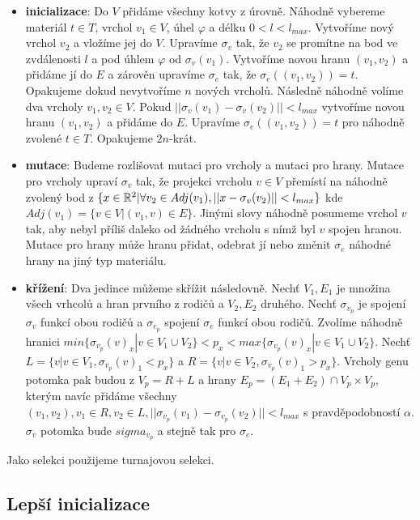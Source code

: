 \begin{itemize}
    \item \textbf{inicializace}: Do $V$ přidáme všechny kotvy z úrovně. Náhodně vybereme materiál $t \in T$, vrchol $v_1 \in V$, úhel $\varphi$ a délku $0 < l < l_{max}$. Vytvoříme nový vrchol $v_2$ a vložíme jej do $V$. Upravíme $\sigma_v$ tak, že $v_2$ se promítne na bod ve zvdálenosti $l$ a pod úhlem $\varphi$ od $\sigma_v(v_1)$. Vytvoříme novou hranu $(v_1, v_2)$ a přidáme jí do $E$ a zárověn upravíme $\sigma_e$ tak, že $\sigma_e((v_1, v_2)) = t$. Opakujeme dokud nevytvoříme $n$ nových vrcholů. Následně náhodně volíme dva vrcholy $v_1, v_2 \in V$. Pokud $||\sigma_v(v_1) - \sigma_v(v_2)|| < l_{max}$ vytvoříme novou hranu $(v_1, v_2)$ a přidáme do $E$. Upravíme $\sigma_e((v_1, v_2)) = t$ pro náhodně zvolené $t \in T$. Opakujeme $2n$-krát.
    \item \textbf{mutace}: Budeme rozlišovat mutaci pro vrcholy a mutaci pro hrany. Mutace pro vrcholy upraví $\sigma_v$ tak, že projekci vrcholu $v \in V$ přemístí na náhodně zvolený bod z $\{ x \in \mathbb{R}^2 | \forall v_2 \in Adj(v_1), ||x - \sigma_v(v_2)|| < l_{max}\}$ kde $Adj(v_1) = \{v \in V | (v_1, v) \in E\}$. Jinými slovy náhodně posumeme vrchol $v$ tak, aby nebyl příliš daleko od žádného vrcholu s nímž byl $v$ spojen hranou. Mutace pro hrany může hranu přidat, odebrat jí nebo změnit $\sigma_e$ náhodné hrany na jiný typ materiálu.
    \item \textbf{křížení}: Dva jedince můžeme skřížit následovně. Nechť $V_1, E_1$ je množina všech vrhcolů a hran prvního z rodičů a $V_2, E_2$ druhého. Nechť $\sigma_{v_p}$ je spojení $\sigma_v$ funkcí obou rodičů a $\sigma_{e_p}$ spojení $\sigma_e$ funkcí obou rodičů. Zvolíme náhodně hranici $min\{\sigma_{v_p}(v)_x | v \in V_1 \cup V_2\} < p_x < max\{\sigma_{v_p}(v)_x | v \in V_1 \cup V_2\}$. Nechť $L = \{ v | v \in V_1, \sigma_{v_p}(v)_1 < p_x\}$ a $R = \{ v | v \in V_2, \sigma_{v_p}(v)_1 > p_x\}$. Vrcholy genu potomka pak budou z $V_p = R + L$ a hrany $E_p = (E_1 + E_2) \cap V_p \times V_p$, kterým navíc přidáme všechny $(v_1, v_2), v_1 \in R, v_2 \in L, ||\sigma_{v_p}(v_1) - \sigma_{v_p}(v_2)|| < l_{max}$ s pravděpodobností $\alpha$. $\sigma_v$ potomka bude $sigma_{v_p}$ a stejně tak pro $\sigma_e$.
\end{itemize}

Jako selekci použijeme turnajovou selekci.

\subsection{Lepší inicializace}

